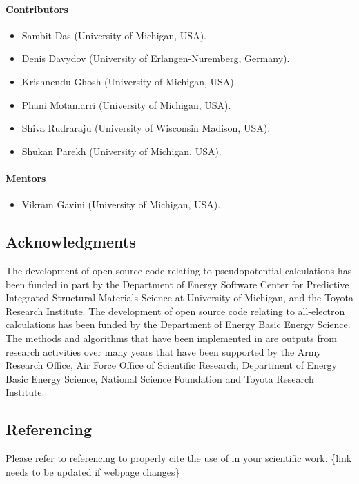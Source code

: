 \paragraph{Contributors}
\begin{itemize}
	\item Sambit Das (University of Michigan, USA).
	\item Denis Davydov (University of Erlangen-Nuremberg, Germany).
	\item Krishnendu Ghosh (University of Michigan, USA).
	\item Phani Motamarri (University of Michigan, USA).
	\item Shiva Rudraraju (University of Wisconsin Madison, USA).
	\item Shukan Parekh (University of Michigan, USA). 	
\end{itemize}

\paragraph{Mentors}
\begin{itemize}
	\item Vikram Gavini (University of Michigan, USA).
\end{itemize}

\subsection{Acknowledgments}
The development of \dftfe{} open source code relating to pseudopotential calculations has been funded in part by the Department of Energy Software Center for Predictive Integrated Structural Materials Science at University of Michigan, and the Toyota Research Institute. The development of \dftfe{} open source code relating to all-electron calculations has been funded by the Department of Energy Basic Energy Science. The methods and algorithms that have been implemented in \dftfe{} are outputs from research activities over many years that have been supported by the Army Research Office, Air Force Office of Scientific Research, Department of Energy Basic Energy Science, National Science Foundation and Toyota Research Institute. 

\subsection{Referencing \dftfe{}}
Please refer to \href{https://sites.google.com/umich.edu/dftfe/publications}{referencing  \dftfe{}} to properly cite the use of \dftfe{} in your scientific work.  { \color{red} \{link needs to be updated if webpage changes\}}
